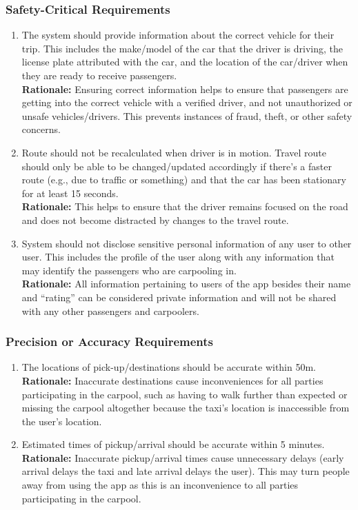 \documentclass[]{article}
\begin{document}
\subsubsection{Safety-Critical Requirements}
\label{ssub:safety_critical_requirements}
\begin{enumerate}[{PR-SC}1. ]
	\item The system should provide information about the correct vehicle for their trip. This includes the make/model of the car that the driver is driving, the license plate attributed with the car, and the location of the car/driver when they are ready to receive passengers.\\
	{\bf Rationale:} Ensuring correct information helps to ensure that passengers are getting into the correct vehicle with a verified driver, and not unauthorized or unsafe vehicles/drivers. This prevents instances of fraud, theft, or other safety concerns. 
	\item Route should not be recalculated when driver is in motion. Travel route should only be able to be changed/updated accordingly if there's a faster route (e.g., due to traffic or something) and that the car has been stationary for at least 15 seconds.\\
	{\bf Rationale:} This helps to ensure that the driver remains focused on the road and does not become distracted by changes to the travel route.
	\item System should not disclose sensitive personal information of any user to other user. This includes the profile of the user along with any information that may identify the passengers who are carpooling in.\\
	{\bf Rationale:} All information pertaining to users of the app besides their name and “rating” can be considered private information and will not be shared with any other passengers and carpoolers. 
\end{enumerate}

\subsubsection{Precision or Accuracy Requirements}
\label{ssub:precision_or_accuracy_requirements}
\begin{enumerate}[{PR-PA}1. ]
	\item The locations of pick-up/destinations should be accurate within 50m.\\
	{\bf Rationale:} Inaccurate destinations cause inconveniences for all parties participating in the carpool, such as having to walk further than expected or missing the carpool altogether because the taxi's location is inaccessible from the user's location. 
	\item Estimated times of pickup/arrival should be accurate within 5 minutes.\\
	{\bf Rationale:} Inaccurate pickup/arrival times cause unnecessary delays (early arrival delays the taxi and late arrival delays the user). This may turn people away from using the app as this is an inconvenience to all parties participating in the carpool. 
\end{enumerate}
\end{document}
